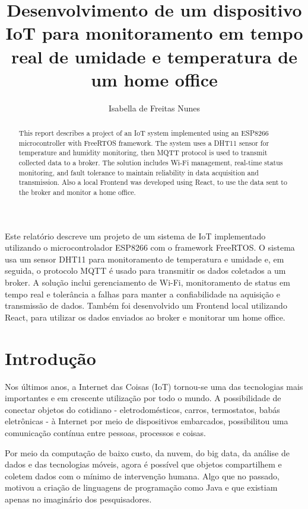 \documentclass[12pt]{article}
\title{Desenvolvimento de um dispositivo IoT para monitoramento em tempo real de umidade e temperatura de um home office}
\author{Isabella de Freitas Nunes\inst{1}}
\begin{document}
 

\maketitle

\begin{abstract}
  This report describes a project of an IoT system implemented using an ESP8266 microcontroller with FreeRTOS framework. The system uses a DHT11 sensor for temperature and humidity monitoring, then MQTT protocol is used to transmit collected data to a broker. The solution includes Wi-Fi management, real-time status monitoring, and fault tolerance to maintain reliability in data acquisition and transmission. Also a local Frontend was developed using React, to use the data sent to the broker and monitor a home office.
\end{abstract}
     
\begin{resumo} 
  Este relatório descreve um projeto de um sistema de IoT implementado utilizando o microcontrolador ESP8266 com o framework FreeRTOS. O sistema usa um sensor DHT11 para monitoramento de temperatura e umidade e, em seguida, o protocolo MQTT é usado para transmitir os dados coletados a um broker. A solução inclui gerenciamento de Wi-Fi, monitoramento de status em tempo real e tolerância a falhas para manter a confiabilidade na aquisição e transmissão de dados. Também foi desenvolvido um Frontend local utilizando React, para utilizar os dados enviados ao broker e monitorar um home office.
\end{resumo}

\section{Introdução}

Nos últimos anos, a Internet das Coisas (IoT) tornou-se uma das tecnologias mais importantes e em crescente utilização por todo o mundo. A possibilidade de conectar objetos do cotidiano - eletrodomésticos, carros, termostatos, babás eletrônicas - à Internet por meio de dispositivos embarcados, possibilitou uma comunicação contínua entre pessoas, processos e coisas.

Por meio da computação de baixo custo, da nuvem, do big data, da análise de dados e das tecnologias móveis, agora é possível que objetos compartilhem e coletem dados com o mínimo de intervenção humana. Algo que no passado, motivou a criação de linguagens de programação como Java e que existiam apenas no imaginário dos pesquisadores.
\end{document}
